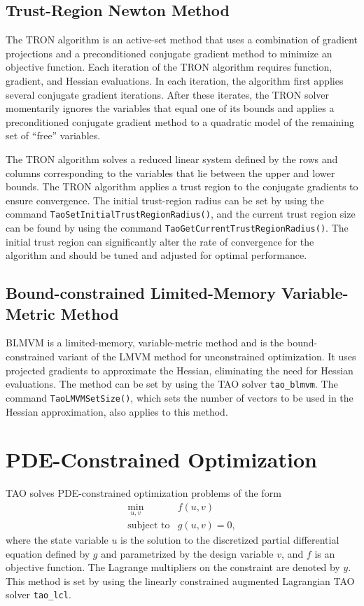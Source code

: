 \subsection{Trust-Region Newton Method}\label{sec:tron}
The TRON \cite{lin_c3} algorithm is an active-set method that uses a 
combination of gradient projections and 
a preconditioned conjugate gradient method to minimize an objective function.
Each iteration of the TRON algorithm requires function, gradient, 
and Hessian evaluations.  In each iteration, the algorithm
first applies several conjugate gradient iterations.  
After these iterates, the TRON solver momentarily ignores the variables
that equal one of its bounds and
applies a preconditioned conjugate gradient method to a
quadratic model of the remaining set of ``free'' variables.  


The TRON algorithm solves a reduced linear system
defined by the rows and columns corresponding to the variables that
lie between the upper and lower bounds.
The TRON algorithm applies a trust region to the 
conjugate gradients to ensure convergence.  The initial trust-region
radius
can be set by using the command 
{\tt Tao\-Set\-Initial\-Trust\-Region\-Radius()},
and the current trust region size can be found by using the command
{\tt Tao\-Get\-Current\-Trust\-Region\-Radius()}.
The initial trust region can significantly alter the 
rate of convergence for the algorithm and should be
tuned and adjusted for optimal performance.

\subsection{Bound-constrained Limited-Memory Variable-Metric Method}
\label{sec:blmvm}

BLMVM is a limited-memory, variable-metric method and is 
the bound-constrained variant of the LMVM method for
unconstrained optimization.  It uses projected gradients to approximate
the Hessian, eliminating the need for Hessian evaluations.
The method can be set by using the TAO solver {\tt tao\_blmvm}.
The command {\tt Tao\-LMVM\-Set\-Size()}, which sets the number
of vectors to be used in the Hessian approximation, 
also applies to this method.

\section{PDE-Constrained Optimization}
\label{sec:lcl}

TAO solves PDE-constrained optimization problems of the form
\[
\begin{array}{ll}
\displaystyle \min_{u,v} & f(u,v) \\
\mbox{subject to} & g(u,v) = 0,
\end{array}
\]
where the state variable $u$ is the solution to the discretized
partial differential equation defined by $g$ and parametrized by 
the design variable $v$, and $f$ is an objective function.  The 
Lagrange multipliers on the constraint are denoted by $y$.
This method is set by using the linearly constrained augmented
Lagrangian TAO solver {\tt tao\_lcl}.

